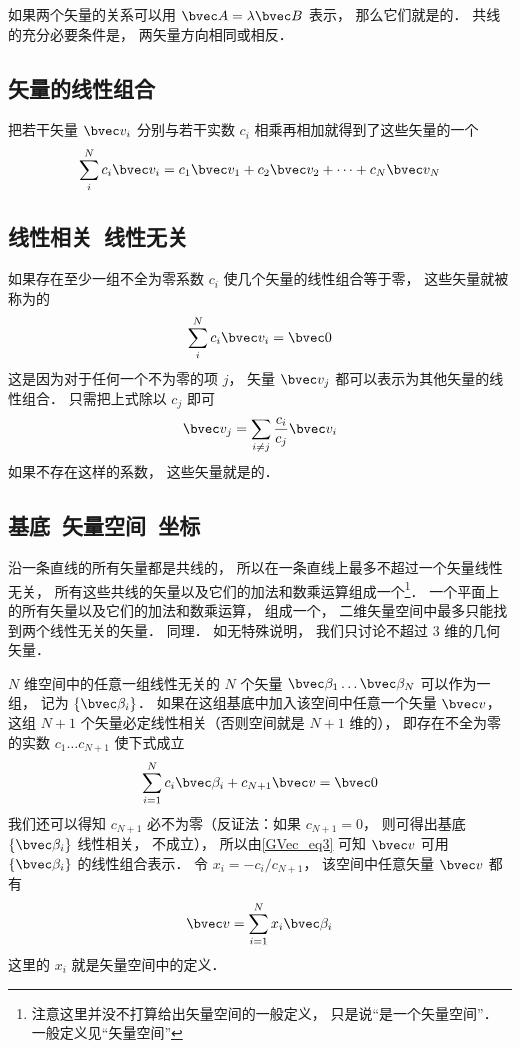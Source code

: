 如果两个矢量的关系可以用 $\bvec A = \lambda\bvec B$ 表示， 那么它们就是的． 共线的充分必要条件是， 两矢量方向相同或相反．

\subsection{矢量的线性组合}
把若干矢量 $\bvec v_i$ 分别与若干实数 $c_i$ 相乘再相加就得到了这些矢量的一个
\begin{equation}
\sum_i^N c_i \bvec v_i = c_1\bvec v_1 + c_2\bvec v_2 +\dots +c_N \bvec v_N
\end{equation}

\subsection{线性相关\ 线性无关}
如果存在至少一组不全为零系数 $c_i$ 使几个矢量的线性组合等于零， 这些矢量就被称为的
\begin{equation}\label{GVec_eq2}
\sum_i^N c_i \bvec v_i = \bvec 0
\end{equation}
这是因为对于任何一个不为零的项 $j$， 矢量 $\bvec v_j$ 都可以表示为其他矢量的线性组合． 只需把上式除以 $c_j$ 即可
\begin{equation}\label{GVec_eq3}
\bvec v_j = \sum_{i \ne j}\frac{c_i}{c_j} \bvec v_i
\end{equation}
如果不存在这样的系数， 这些矢量就是的． 

\subsection{基底\ 矢量空间\ 坐标}
沿一条直线的所有矢量都是共线的， 所以在一条直线上最多不超过一个矢量线性无关， 所有这些共线的矢量以及它们的加法和数乘运算组成一个\footnote{注意这里并没不打算给出矢量空间的一般定义， 只是说“是一个矢量空间”． 一般定义见“矢量空间”}． 一个平面上的所有矢量以及它们的加法和数乘运算， 组成一个， 二维矢量空间中最多只能找到两个线性无关的矢量． 同理． 如无特殊说明， 我们只讨论不超过 3 维的几何矢量．

$N$ 维空间中的任意一组线性无关的 $N$ 个矢量 $\bvec \beta_1\dots \bvec \beta_N$ 可以作为一组， 记为 $\{\bvec \beta_i\}$． 如果在这组基底中加入该空间中任意一个矢量 $\bvec v$， 这组 $N+1$ 个矢量必定线性相关（否则空间就是 $N+1$ 维的）， 即存在不全为零的实数 $c_1\dots c_{N+1}$ 使下式成立
\begin{equation}
\sum_{i=1}^N c_i \bvec \beta_i + c_{N+1} \bvec v = \bvec 0
\end{equation}
我们还可以得知 $c_{N+1}$ 必不为零（反证法：如果 $c_{N+1} = 0$， 则可得出基底 $\{\bvec \beta_i\}$ 线性相关， 不成立）， 所以由\autoref{GVec_eq3} 可知 $\bvec v$ 可用 $\{\bvec \beta_i\}$ 的线性组合表示． 令 $x_i = -c_i/c_{N+1}$， 该空间中任意矢量 $\bvec v$ 都有
\begin{equation}\label{GVec_eq5}
\bvec v = \sum_{i=1}^N x_i \bvec \beta_i
\end{equation}
这里的 $x_i$ 就是矢量空间中的定义．

